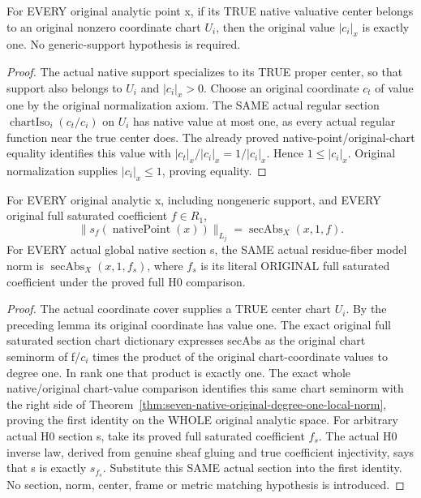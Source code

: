 \begin{lemma}
\label{lem:seven-native-center-chart-original-unit-value}
\leanok
For EVERY original analytic point x, if its TRUE native valuative center
belongs to an original nonzero coordinate chart $U_i$, then the original
value $|c_i|_x$ is exactly one. No generic-support hypothesis is required.
\end{lemma}
\begin{proof}
The actual native support specializes to its TRUE proper center, so that
support also belongs to $U_i$ and $|c_i|_x>0$. Choose an original coordinate
$c_t$ of value one by the original normalization axiom. The SAME actual
regular section $\operatorname{chartIso}_i(c_t/c_i)$ on $U_i$ has native value
at most one, as every actual regular function near the true center does.
The already proved native-point/original-chart equality identifies this
value with $|c_t|_x/|c_i|_x=1/|c_i|_x$. Hence $1\le|c_i|_x$.
Original normalization supplies $|c_i|_x\le1$, proving equality.
\end{proof}

\begin{theorem}
\label{thm:seven-native-full-degree-one-model-norm-dictionary}
\leanok
For EVERY original analytic x, including nongeneric support, and EVERY
original full saturated coefficient $f\in R_1$,
\[
 \|s_f(\operatorname{nativePoint}(x))\|_{L_j}
   =\operatorname{secAbs}_X(x,1,f).
\]
For EVERY actual global native section s, the SAME actual residue-fiber
model norm is $\operatorname{secAbs}_X(x,1,f_s)$, where $f_s$ is its literal
ORIGINAL full saturated coefficient under the proved full H0 comparison.
\end{theorem}
\begin{proof}
The actual coordinate cover supplies a TRUE center chart $U_i$. By the
preceding lemma its original coordinate has value one. The exact original
full saturated section chart dictionary expresses secAbs as the original
chart seminorm of f/$c_i$ times the product of the original chart-coordinate
values to degree one. In rank one that product is exactly one. The exact
whole native/original chart-value comparison identifies this same chart
seminorm with the right side of
Theorem~\ref{thm:seven-native-original-degree-one-local-norm}, proving the
first identity on the WHOLE original analytic space. For arbitrary actual
H0 section s, take its proved full saturated coefficient $f_s$. The actual
H0 inverse law, derived from genuine sheaf gluing and true coefficient
injectivity, says that s is exactly $s_{f_s}$. Substitute this SAME actual
section into the first identity. No section, norm, center, frame or metric
matching hypothesis is introduced.
\end{proof}

